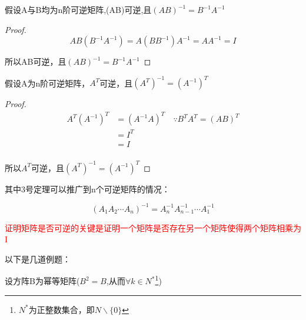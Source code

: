 \begin{example}
	假设A与B均为n阶可逆矩阵,(AB)可逆,且$(AB)^{-1}=B^{-1}A^{-1}$

	\begin{proof}
		$$
			AB(B^{-1}A^{-1})=A(BB^{-1})A^{-1}=AA^{-1}=I
		$$

		所以AB可逆，且$(AB)^{-1}=B^{-1}A^{-1}$
	\end{proof}
\end{example}

\begin{example}
	假设A为n阶可逆矩阵，$A^T$可逆，且$(A^T)^{-1}=(A^{-1})^T$

	\begin{proof}
		$$
			\begin{aligned}
				A^T(A^{-1})^T & =(A^{-1}A)^T\quad \because B^TA^T=(AB)^T \\
				              & =I^T                                     \\
				              & =I                                       \\
			\end{aligned}
		$$

		所以$A^T$可逆，且$(A^T)^{-1}=(A^{-1})^T$
	\end{proof}
\end{example}

其中3号定理可以推广到n个可逆矩阵的情况：

$$
	(A_1A_2\cdots A_n)^{-1}=A_n^{-1}A_{n-1}^{-1}\cdots A_1^{-1}  $$

\textcolor{red}{证明矩阵是否可逆的关键是证明一个矩阵是否存在另一个矩阵使得两个矩阵相乘为I}

以下是几道例题：

\begin{example}

设方阵B为幂等矩阵($B^2=B$,从而$\forall  k\in N^*$\footnote[1]{$N^*$为正整数集合，即$N\backslash\{0\}$})

\end{example}

